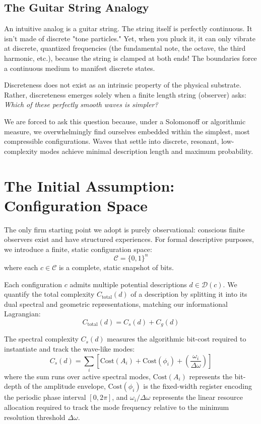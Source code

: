 \subsection*{The Guitar String Analogy}

An intuitive analog is a guitar string.
The string itself is perfectly continuous. It isn't made of discrete "tone particles."
Yet, when you pluck it, it can only vibrate at discrete, quantized frequencies (the fundamental note, the octave, the third harmonic, etc.), 
because the string is clamped at both ends! The boundaries force a continuous medium to manifest discrete states.

Discreteness does not exist as an intrinsic property of the physical substrate.
Rather, discreteness emerges solely when a finite length string (observer) asks: \emph{Which of these perfectly smooth waves is simpler?}

We are forced to ask this question because, under a Solomonoff or algorithmic measure, we overwhelmingly find ourselves embedded within the simplest,
most compressible configurations. Waves that settle into discrete, resonant, low-complexity modes achieve minimal description length and maximum probability. 



\section{The Initial Assumption: Configuration Space}

The only firm starting point we adopt is purely observational: conscious finite observers exist and have structured experiences.
For formal descriptive purposes, we introduce a finite, static configuration space:
\[
\mathcal{C} = \{0,1\}^n
\]
where each $c \in \mathcal{C}$ is a complete, static snapshot of bits. 

Each configuration $c$ admits multiple potential descriptions $d \in \mathcal{D}(c)$.
We quantify the total complexity $C_{\text{total}}(d)$ of a description by splitting it into its dual spectral and geometric representations, matching our informational Lagrangian:
\[
C_{\text{total}}(d) = C_s(d) + C_g(d)
\]

The spectral complexity $C_s(d)$ measures the algorithmic bit-cost required to instantiate and track the wave-like modes:
\[
C_s(d) = \sum_i \left[ \text{Cost}(A_i) + \text{Cost}(\phi_i) + \left(\frac{\omega_i}{\Delta \omega}\right) \right]
\]
where the sum runs over active spectral modes, $\text{Cost}(A_i)$ represents the bit-depth of the amplitude envelope, $\text{Cost}(\phi_i)$ is the fixed-width register encoding the periodic phase interval $[0, 2\pi]$, and $\omega_i / \Delta \omega$ represents the linear resource allocation required to track the mode frequency relative to the minimum resolution threshold $\Delta\omega$.

